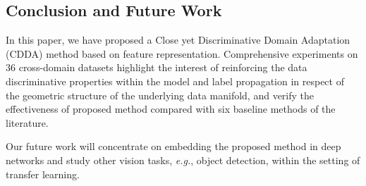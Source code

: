 \documentclass[10pt,twocolumn,letterpaper]{article}
\begin{document}
\begin{CJK*}{UTF8}{gkai}
	
\section{Conclusion and Future Work}
In this paper, we have proposed a Close yet Discriminative Domain Adaptation (CDDA) method based on feature representation. Comprehensive experiments on 36 cross-domain datasets highlight the interest of reinforcing the data discriminative properties within the model and label propagation in respect of the geometric structure of the underlying data manifold, and  verify the effectiveness  of proposed method compared with six baseline methods of the literature.  


Our future work will concentrate on embedding the proposed method in  deep  networks and study other vision tasks, \textit{e.g.}, object detection, within the setting of transfer learning.








{\small


}
\end{CJK*}
\end{document}
